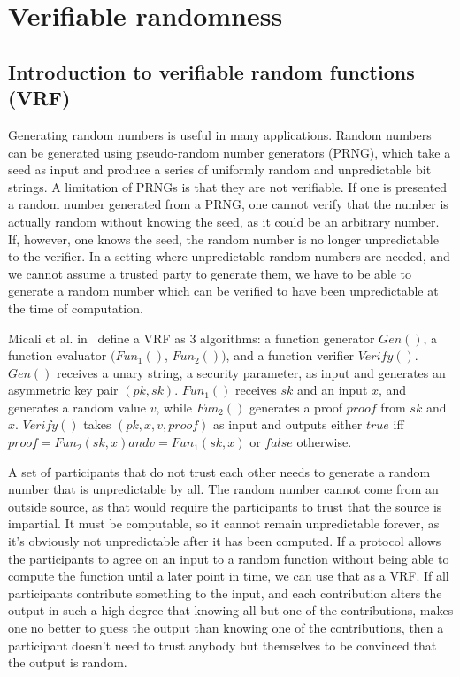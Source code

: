 \section{Verifiable randomness}
\label{sec:vrf}

\subsection{Introduction to verifiable random functions (VRF)}

Generating random numbers is useful in many applications. Random numbers can be generated using pseudo-random number generators (PRNG), which take a seed as input and produce a series of uniformly random and unpredictable bit strings. A limitation of PRNGs is that they are not verifiable. If one is presented a random number generated from a PRNG, one cannot verify that the number is actually random without knowing the seed, as it could be an arbitrary number. If, however, one knows the seed, the random number is no longer unpredictable to the verifier. In a setting where unpredictable random numbers are needed, and we cannot assume a trusted party to generate them, we have to be able to generate a random number which can be verified to have been unpredictable at the time of computation.

Micali et al. in~\cite{micali_verifiable_1999} define a VRF as 3 algorithms: a function generator $Gen()$, a function evaluator $(Fun_1()$, $Fun_2())$, and a function verifier $Verify()$. $Gen()$ receives a unary string, a security parameter, as input and generates an asymmetric key pair $(pk, sk)$. $Fun_1()$ receives $sk$ and an input $x$, and generates a random value $v$, while $Fun_2()$ generates a proof $proof$ from $sk$ and $x$. $Verify()$ takes $(pk, x, v, proof)$ as input and outputs either $true$ iff $proof=Fun_2(sk, x) and v=Fun_1(sk, x)$ or $false$ otherwise.

A set of participants that do not trust each other needs to generate a random number that is unpredictable by all. The random number cannot come from an outside source, as that would require the participants to trust that the source is impartial. It must be computable, so it cannot remain unpredictable forever, as it's obviously not unpredictable after it has been computed. If a protocol allows the participants to agree on an input to a random function without being able to compute the function until a later point in time, we can use that as a VRF. If all participants contribute something to the input, and each contribution alters the output in such a high degree that knowing all but one of the contributions, makes one no better to guess the output than knowing one of the contributions, then a participant doesn't need to trust anybody but themselves to be convinced that the output is random.


